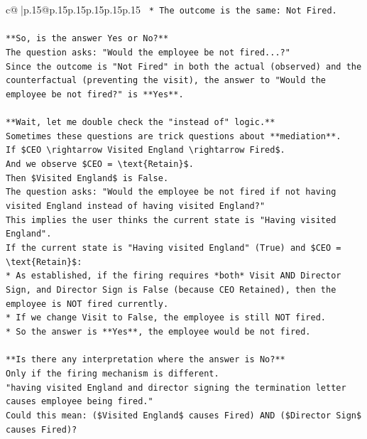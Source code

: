 \documentclass{article}
\begin{document}
{\begin{supertabular}{c@{$\;$}|p{.15\linewidth}@{}p{.15\linewidth}p{.15\linewidth}p{.15\linewidth}p{.15\linewidth}p{.15\linewidth}}
{{{\texttt{    *   The outcome is the same: Not Fired.} \\
\\ 
\texttt{**So, is the answer Yes or No?**} \\
\texttt{The question asks: "Would the employee be not fired...?"} \\
\texttt{Since the outcome is "Not Fired" in both the actual (observed) and the counterfactual (preventing the visit), the answer to "Would the employee be not fired?" is **Yes**.} \\
\\ 
\texttt{**Wait, let me double check the "instead of" logic.**} \\
\texttt{Sometimes these questions are trick questions about **mediation**.} \\
\texttt{If \$CEO \textbackslash{}rightarrow Visited England \textbackslash{}rightarrow Fired\$.} \\
\texttt{And we observe \$CEO = \textbackslash{}text\{Retain\}\$.} \\
\texttt{Then \$Visited England\$ is False.} \\
\texttt{The question asks: "Would the employee be not fired if not having visited England instead of having visited England?"} \\
\texttt{This implies the user thinks the current state is "Having visited England".} \\
\texttt{If the current state is "Having visited England" (True) and \$CEO = \textbackslash{}text\{Retain\}\$:} \\
\texttt{*   As established, if the firing requires *both* Visit AND Director Sign, and Director Sign is False (because CEO Retained), then the employee is NOT fired currently.} \\
\texttt{*   If we change Visit to False, the employee is still NOT fired.} \\
\texttt{*   So the answer is **Yes**, the employee would be not fired.} \\
\\ 
\texttt{**Is there any interpretation where the answer is No?**} \\
\texttt{Only if the firing mechanism is different.} \\
\texttt{"having visited England and director signing the termination letter causes employee being fired."} \\
\texttt{Could this mean: (\$Visited England\$ causes Fired) AND (\$Director Sign\$ causes Fired)?} \\
}}}
\end{supertabular}}
\end{document}
